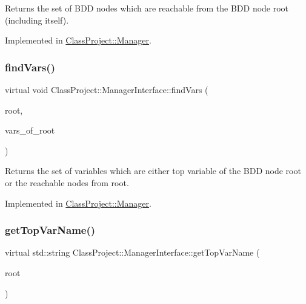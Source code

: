 \begin{DoxyReturn}{Returns}
the set of B\+DD nodes which are reachable from the B\+DD node root (including itself). 
\end{DoxyReturn}


Implemented in \hyperlink{classClassProject_1_1Manager_a2aefec8f025f8d7417eff8493bcd7f04}{Class\+Project\+::\+Manager}.

\mbox{\label{classClassProject_1_1ManagerInterface_ab94feabca2125d334e542e502ae0186d}} 
\subsubsection{\texorpdfstring{find\+Vars()}{findVars()}}
{\footnotesize\ttfamily virtual void Class\+Project\+::\+Manager\+Interface\+::find\+Vars (\begin{DoxyParamCaption}\item[{const B\+D\+D\+\_\+\+ID \&}]{root,  }\item[{std\+::set$<$ B\+D\+D\+\_\+\+ID $>$ \&}]{vars\+\_\+of\+\_\+root }\end{DoxyParamCaption})\hspace{0.3cm}{\ttfamily [pure virtual]}}

\begin{DoxyReturn}{Returns}
the set of variables which are either top variable of the B\+DD node root or the reachable nodes from root. 
\end{DoxyReturn}


Implemented in \hyperlink{classClassProject_1_1Manager_abf869470f4d1baffca8a140d3196c2ad}{Class\+Project\+::\+Manager}.

\mbox{\label{classClassProject_1_1ManagerInterface_afde45b2065361dfa6e61c1c7bc3fc1b4}} 
\subsubsection{\texorpdfstring{get\+Top\+Var\+Name()}{getTopVarName()}}
{\footnotesize\ttfamily virtual std\+::string Class\+Project\+::\+Manager\+Interface\+::get\+Top\+Var\+Name (\begin{DoxyParamCaption}\item[{const B\+D\+D\+\_\+\+ID \&}]{root }\end{DoxyParamCaption})\hspace{0.3cm}{\ttfamily [pure virtual]}}

